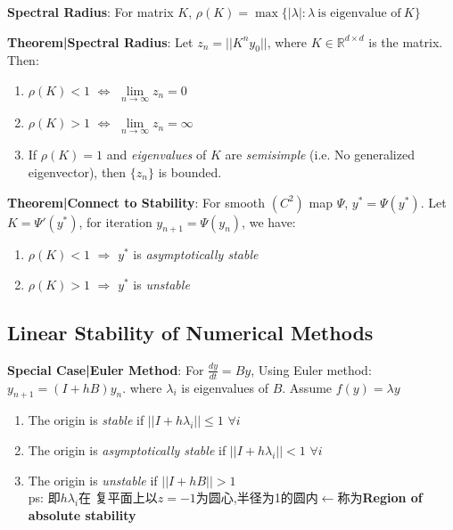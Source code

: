 \documentclass[9pt]{article}
\begin{document}
\textbf{Spectral Radius}: For matrix $K$, $\rho(K)=\max\{|\lambda|:\lambda \ \text{is eigenvalue of} \ K\}$

\textbf{Theorem|Spectral Radius}: Let $z_n=||K^ny_0||$, where $K\in\mathbb{R}^{d\times d}$ is the matrix. Then:

\begin{enumerate}[itemsep=-2pt, topsep=-2pt]
    \item $\rho(K)<1$ $\Leftrightarrow$ $\lim\limits_{n\to\infty}z_n=0$
    \item $\rho(K)>1$ $\Leftrightarrow$ $\lim\limits_{n\to\infty}z_n=\infty$
    \item If $\rho(K)=1$ and \textit{eigenvalues} of $K$ are \textit{semisimple} {\scriptsize (i.e. No generalized eigenvector)}, then $\{z_n\}$ is bounded.
\end{enumerate}

\textbf{Theorem|Connect to Stability}: For smooth $(C^2)$ map $\Psi$, $y^*=\Psi(y^*)$. Let $K=\Psi'(y^*)$, for iteration $y_{n+1}=\Psi(y_n)$, we have: 

\begin{enumerate}[itemsep=-2pt, topsep=-2pt]
    \item $\rho(K)<1$ $\Rightarrow$ $y^*$ is \textit{asymptotically stable}
    \item $\rho(K)>1$ $\Rightarrow$ $y^*$ is \textit{unstable}
\end{enumerate}


\subsection{Linear Stability of Numerical Methods} %

\textbf{Special Case|Euler Method}: {\small For $\frac{dy}{dt}=By$, Using Euler method: $y_{n+1}=(I+hB)y_n$. where $\lambda_i$ is eigenvalues of $B$. \quad Assume $f(y)=\lambda y$}
\begin{enumerate}[itemsep=-2pt, topsep=-2pt]
    \item The origin is \textit{stable} if $||I+h\lambda_i||\leq1$ $\forall i$
    \item The origin is \textit{asymptotically stable} if $||I+h\lambda_i||<1$ $\forall i$
    \item The origin is \textit{unstable} if $||I+hB||>1$ \\
    {\footnotesize ps: 即$h\lambda_i$在 复平面上以$z=-1$为圆心,半径为1的圆内$\leftarrow$称为\textbf{Region of absolute stability}}
\end{enumerate}
\end{document}
